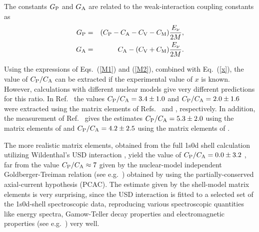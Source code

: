 \documentclass[12pt]{iopart}
\begin{document}
The constants
$G_{\rm P}$ and $G_{\rm A}$ are related to the weak-interaction coupling
constants as
        \begin{eqnarray}
        G_{\rm P}&=&(C_{\rm P}-C_{\rm A}-C_{\rm V}-C_{\rm M}){E_\nu\over2M},\\
        G_{\rm A}&=&C_{\rm A}-(C_{\rm V}+C_{\rm M}){E_\nu\over2M}.
        \end{eqnarray}

Using the expressions of Eqs.\ (\ref{M1}) and (\ref{M2}), combined with Eq.\
(\ref{x}), the value
of $C_{\rm P}/C_{\rm A}$ can be extracted if the experimental value of $x$ is
known. However, calculations with different nuclear models give very different
predictions for this ratio. In Ref.\ \cite{bru95} the values
$C_{\rm P}/C_{\rm A}=3.4\pm1.0$ and $C_{\rm P}/C_{\rm A}=2.0\pm1.6$ were
extracted using the matrix elements of Refs.\ \cite{cie76} and \cite{par81},
respectively. In addition, the measurement of Ref.\ \cite{mof97} gives the
estimates $C_{\rm P}/C_{\rm A}=5.3\pm2.0$ using the matrix elements of
\cite{cie76} and $C_{\rm P}/C_{\rm A}
=4.2\pm2.5$ using the matrix elements of \cite{par81}.

The more realistic matrix elements, obtained
from the full 1s0d shell calculation utilizing Wildenthal's USD
interaction \cite{wil84}, yield the value of $C_{\rm P}/C_{\rm A}=0.0\pm3.2$
\cite{mof97,jun96}, far from the value $C_{\rm P}/C_{\rm A}\approx7$ given by
the nuclear-model independent Goldberger-Treiman relation (see e.g.\
\cite{com83})
obtained by using the partially-conserved axial-current hypothesis (PCAC).
The estimate given by the shell-model matrix elements is very surprising,
since the
USD interaction is fitted to a selected set of the 1s0d-shell spectroscopic
data, reproducing various spectroscopic quantities like
energy spectra, Gamow-Teller decay properties and electromagnetic properties
(see e.g.\ \cite{car86,bro87}) very well.
\end{document}
